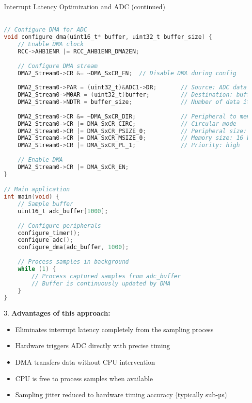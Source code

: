 \begin{example2}{Interrupt Latency Optimization and ADC (continued)}
\begin{lstlisting}[language=C, style=basesmol]

// Configure DMA for ADC
void configure_dma(uint16_t* buffer, uint32_t buffer_size) {
    // Enable DMA clock
    RCC->AHB1ENR |= RCC_AHB1ENR_DMA2EN;
    
    // Configure DMA stream
    DMA2_Stream0->CR &= ~DMA_SxCR_EN;  // Disable DMA during config
    
    DMA2_Stream0->PAR = (uint32_t)&ADC1->DR;       // Source: ADC data register
    DMA2_Stream0->M0AR = (uint32_t)buffer;         // Destination: buffer
    DMA2_Stream0->NDTR = buffer_size;              // Number of data items
    
    DMA2_Stream0->CR &= ~DMA_SxCR_DIR;             // Peripheral to memory
    DMA2_Stream0->CR |= DMA_SxCR_CIRC;             // Circular mode
    DMA2_Stream0->CR |= DMA_SxCR_PSIZE_0;          // Peripheral size: 16 bits
    DMA2_Stream0->CR |= DMA_SxCR_MSIZE_0;          // Memory size: 16 bits
    DMA2_Stream0->CR |= DMA_SxCR_PL_1;             // Priority: high
    
    // Enable DMA
    DMA2_Stream0->CR |= DMA_SxCR_EN;
}

// Main application
int main(void) {
    // Sample buffer
    uint16_t adc_buffer[1000];
    
    // Configure peripherals
    configure_timer();
    configure_adc();
    configure_dma(adc_buffer, 1000);
    
    // Process samples in background
    while (1) {
        // Process captured samples from adc_buffer
        // Buffer is continuously updated by DMA
    }
}
\end{lstlisting}

3. \textbf{Advantages of this approach:}
   \begin{itemize}
     \item Eliminates interrupt latency completely from the sampling process
     \item Hardware triggers ADC directly with precise timing
     \item DMA transfers data without CPU intervention
     \item CPU is free to process samples when available
     \item Sampling jitter reduced to hardware timing accuracy (typically sub-µs)
   \end{itemize}


\end{example2}
